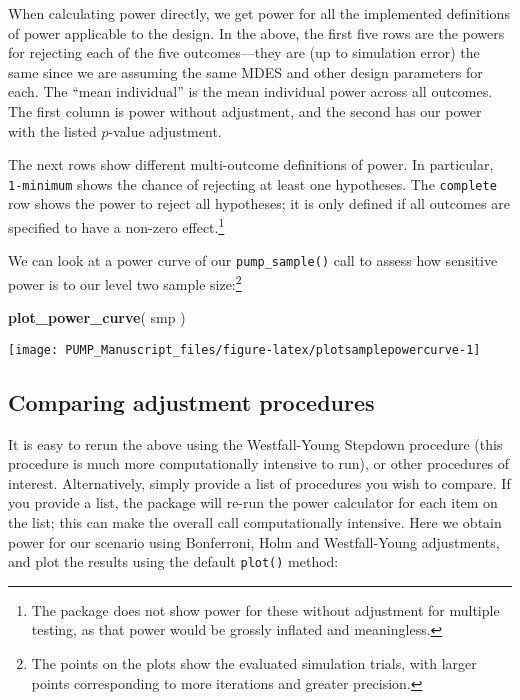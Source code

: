 \documentclass[
]{article}
\newenvironment{Shaded}{\begin{snugshade}}{\end{snugshade}}
\newcommand{\KeywordTok}[1]{\textcolor[rgb]{0.13,0.29,0.53}{\textbf{#1}}}
\newcommand{\NormalTok}[1]{#1}
\begin{document}
When calculating power directly, we get power for all the implemented
definitions of power applicable to the design. In the above, the first
five rows are the powers for rejecting each of the five outcomes---they
are (up to simulation error) the same since we are assuming the same
MDES and other design parameters for each. The ``mean individual'' is
the mean individual power across all outcomes. The first column is power
without adjustment, and the second has our power with the listed
\(p\)-value adjustment.

The next rows show different multi-outcome definitions of power. In
particular, \texttt{1-minimum} shows the chance of rejecting at least
one hypotheses. The \texttt{complete} row shows the power to reject all
hypotheses; it is only defined if all outcomes are specified to have a
non-zero
effect.\footnote{The package does not show power for these without adjustment for multiple testing, as that power would be grossly inflated and meaningless.}

We can look at a power curve of our \texttt{pump\_sample()} call to
assess how sensitive power is to our level two sample
size:\footnote{The points on the plots show the evaluated simulation trials, with larger points corresponding to more iterations and greater precision.}

\begin{Shaded}
\begin{Highlighting}[]
\KeywordTok{plot\_power\_curve}\NormalTok{( smp )}
\end{Highlighting}
\end{Shaded}

\begin{center}\texttt{[image: PUMP\_Manuscript\_files/figure-latex/plotsamplepowercurve-1]} \end{center}

\subsection{Comparing adjustment procedures}

It is easy to rerun the above using the Westfall-Young Stepdown
procedure (this procedure is much more computationally intensive to
run), or other procedures of interest. Alternatively, simply provide a
list of procedures you wish to compare. If you provide a list, the
package will re-run the power calculator for each item on the list; this
can make the overall call computationally intensive. Here we obtain
power for our scenario using Bonferroni, Holm and Westfall-Young
adjustments, and plot the results using the default \texttt{plot()}
method:
\end{document}

